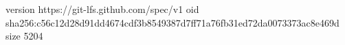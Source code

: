 version https://git-lfs.github.com/spec/v1
oid sha256:c56c12d28d91dd4674cdf3b8549387d7ff71a76fb31ed72da0073373ac8e469d
size 5204
